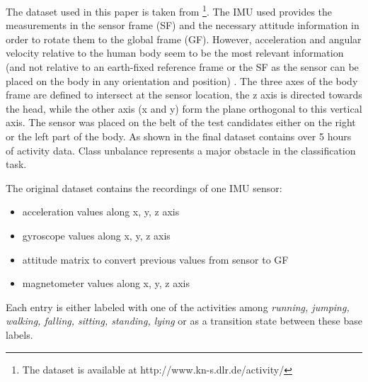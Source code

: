 The dataset used in this paper is taken from \cite{base-paper} \footnote{The dataset is available at http://www.kn-s.dlr.de/activity/}. The IMU used provides the measurements in the sensor frame (SF) and the necessary attitude information in order to rotate them to the global frame (GF). However, acceleration and angular velocity relative to the human body seem to be the most relevant information (and not relative to an earth-fixed reference frame or the SF as the sensor can be placed on the body in any orientation and position) \cite{base-paper}.
The three axes of the body frame are defined to intersect at the sensor location, the z axis is directed towards the head, while the other axis (x and y) form the plane orthogonal to this vertical axis. The sensor was placed on the belt of the test candidates either on the right or the left part of the body.
As shown in  the final dataset contains over 5 hours of activity data. Class unbalance represents a major obstacle in the classification task. \\

\begin{table}[!htbp]
\captionsetup{font=scriptsize, justification=centering}
\centering
{}
\caption{Total activity data times for each recorded activity.}
\label{activity_times_table}
\end{table}

The original dataset contains the recordings of one IMU sensor:
\begin{itemize}
\item acceleration values along x, y, z axis
\item gyroscope values along x, y, z axis
\item attitude matrix to convert previous values from sensor to GF
\item magnetometer values along x, y, z axis
\end{itemize}
Each entry is either labeled with one of the activities among {\it running, jumping, walking, falling, sitting, standing, lying} or as a transition state between these base labels.

